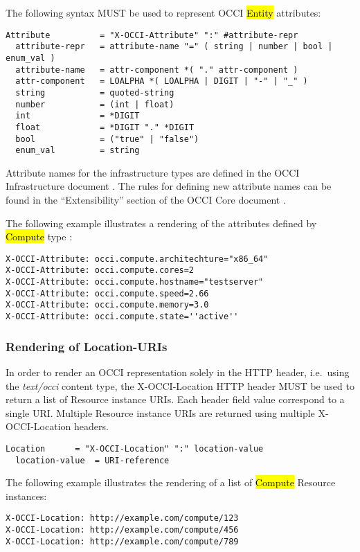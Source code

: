 \documentclass[10pt,a4paper]{article}
\begin{document}
The following syntax MUST be used to represent OCCI \hl{Entity}
attributes:

\begin{verbatim}
Attribute          = "X-OCCI-Attribute" ":" #attribute-repr
  attribute-repr   = attribute-name "=" ( string | number | bool | enum_val )
  attribute-name   = attr-component *( "." attr-component )
  attr-component   = LOALPHA *( LOALPHA | DIGIT | "-" | "_" )	
  string           = quoted-string
  number           = (int | float)
  int              = *DIGIT
  float            = *DIGIT "." *DIGIT
  bool             = ("true" | "false")
  enum_val         = string
\end{verbatim}

Attribute names for the infrastructure types are defined in the OCCI
Infrastructure document \cite{occi:infrastructure}.  The rules for
defining new attribute names can be found in the ``Extensibility''
section of the OCCI Core document \cite{occi:core}.

The following example illustrates a rendering of the attributes
defined by \hl{Compute} type \cite{occi:infrastructure}:

\begin{verbatim}
X-OCCI-Attribute: occi.compute.architechture="x86_64"
X-OCCI-Attribute: occi.compute.cores=2
X-OCCI-Attribute: occi.compute.hostname="testserver"
X-OCCI-Attribute: occi.compute.speed=2.66
X-OCCI-Attribute: occi.compute.memory=3.0
X-OCCI-Attribute: occi.compute.state=''active''
\end{verbatim}

\subsubsection{Rendering of Location-URIs}
In order to render an OCCI representation solely in the HTTP header,
i.e.~using the \textit{text/occi} content type, the X-OCCI-Location
HTTP header MUST be used to return a list of Resource instance
URIs. Each header field value correspond to a single URI. Multiple
Resource instance URIs are returned using multiple X-OCCI-Location
headers.

\begin{verbatim}
Location      = "X-OCCI-Location" ":" location-value
  location-value  = URI-reference
\end{verbatim}

The following example illustrates the rendering of a list of
\hl{Compute} Resource instances:
\begin{verbatim}
X-OCCI-Location: http://example.com/compute/123
X-OCCI-Location: http://example.com/compute/456
X-OCCI-Location: http://example.com/compute/789
\end{verbatim}
\end{document}
